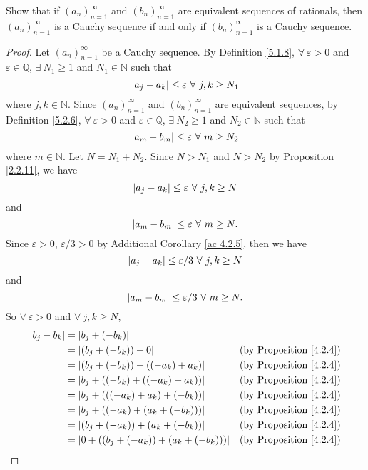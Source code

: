\exercisesection

\begin{exercise}\label{ex 5.2.1}
Show that if \((a_n)_{n = 1}^{\infty}\) and \((b_n)_{n = 1}^{\infty}\) are equivalent sequences of rationals, then \((a_n)_{n = 1}^{\infty}\) is a Cauchy sequence if and only if \((b_n)_{n = 1}^{\infty}\) is a Cauchy sequence.
\end{exercise}

\begin{proof}
Let \((a_n)_{n = 1}^{\infty}\) be a Cauchy sequence.
By Definition \ref{5.1.8}, \(\forall\ \varepsilon > 0\) and \(\varepsilon \in \mathds{Q}\), \(\exists\ N_1 \geq 1\) and \(N_1 \in \mathds{N}\) such that
\[
    \abs*{a_j - a_k} \leq \varepsilon \ \forall\ j, k \geq N_1
\]
where \(j, k \in \mathds{N}\).
Since \((a_n)_{n = 1}^{\infty}\) and \((b_n)_{n = 1}^{\infty}\) are equivalent sequences, by Definition \ref{5.2.6}, \(\forall\ \varepsilon > 0\) and \(\varepsilon \in \mathds{Q}\), \(\exists\ N_2 \geq 1\) and \(N_2 \in \mathds{N}\) such that
\[
    \abs*{a_m - b_m} \leq \varepsilon \ \forall\ m \geq N_2
\]
where \(m \in \mathds{N}\).
Let \(N = N_1 + N_2\).
Since \(N > N_1\) and \(N > N_2\) by Proposition \ref{2.2.11}, we have
\[
    \abs*{a_j - a_k} \leq \varepsilon \ \forall\ j, k \geq N
\]
and
\[
    \abs*{a_m - b_m} \leq \varepsilon \ \forall\ m \geq N.
\]
Since \(\varepsilon > 0\), \(\varepsilon / 3 > 0\) by Additional Corollary \ref{ac 4.2.5}, then we have
\[
    \abs*{a_j - a_k} \leq \varepsilon / 3 \ \forall\ j, k \geq N
\]
and
\[
    \abs*{a_m - b_m} \leq \varepsilon / 3 \ \forall\ m \geq N.
\]
So \(\forall\ \varepsilon > 0\) and \(\forall\ j, k \geq N\),
\begin{align*}
\abs*{b_j - b_k} &= \abs*{b_j + (-b_k)} \\
&= \abs*{(b_j + (-b_k)) + 0} & \text{(by Proposition \ref{4.2.4})} \\
&= \abs*{(b_j + (-b_k)) + ((-a_k) + a_k)} & \text{(by Proposition \ref{4.2.4})} \\
&= \abs*{b_j + ((-b_k) + ((-a_k) + a_k))} & \text{(by Proposition \ref{4.2.4})} \\
&= \abs*{b_j + (((-a_k) + a_k) + (-b_k))} & \text{(by Proposition \ref{4.2.4})} \\
&= \abs*{b_j + ((-a_k) + (a_k + (-b_k)))} & \text{(by Proposition \ref{4.2.4})} \\
&= \abs*{(b_j + (-a_k)) + (a_k + (-b_k))} & \text{(by Proposition \ref{4.2.4})} \\
&= \abs*{0 + ((b_j + (-a_k)) + (a_k + (-b_k)))} & \text{(by Proposition \ref{4.2.4})} \\

\end{align*}
\end{proof}
